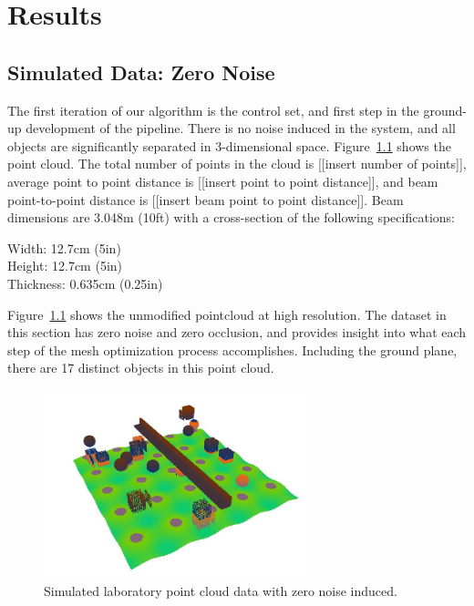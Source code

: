 \documentclass[12pt]{drexelthesis}
\let\Oldsection\section
\renewcommand{\section}{\FloatBarrier\Oldsection}
\begin{document}
\chapter{Results}
\label{chap:results}
\section{Simulated Data: Zero Noise}
The first iteration of our algorithm is the control set, and first step in the ground-up development of the pipeline. There is no noise induced in the system, and all objects are significantly separated in 3-dimensional space. Figure~\ref{zeronoise:raw} shows the point cloud. The total number of points in the cloud is [[insert number of points]], average point to point distance is [[insert point to point distance]], and beam point-to-point distance is [[insert beam point to point distance]]. Beam dimensions are 3.048m (10ft) with a cross-section of the following specifications:


\begin{centering}
Width: 12.7cm (5in)
\\Height: 12.7cm (5in)
\\Thickness: 0.635cm (0.25in) \\
\end{centering}

Figure~\ref{zeronoise:raw} shows the unmodified pointcloud at high resolution. The dataset in this section has zero noise and zero occlusion, and provides insight into what each step of the mesh optimization process accomplishes. Including the ground plane, there are 17 distinct objects in this point cloud.


\begin{figure}[!ht]
		\centering
		\includegraphics[width=3in]{simulated-lab-scan/0noise/sim-lab-0noise.jpg}
		\caption[Simulated laboratory point cloud data with zero noise induced]{\centering Simulated laboratory point cloud data with zero noise induced.}
	\label{zeronoise:raw}
\end{figure}
\end{document}
